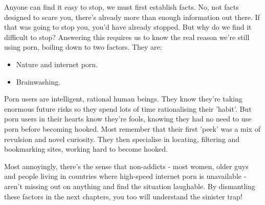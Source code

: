 \documentclass[
]{book}
\begin{document}
Anyone can find it easy to stop, we must first establish facts. No, not facts designed to scare you, there's already more than enough information out there. If that was going to stop you, you'd have already stopped. But why do we find it difficult to stop? Answering this requires us to know the real reason we're still using porn, boiling down to two factors. They are:

\begin{itemize}
\item
  Nature and internet porn.
\item
  Brainwashing.
\end{itemize}

Porn users are intelligent, rational human beings. They know they're taking enormous future risks so they spend lots of time rationalising their 'habit'. But porn users in their hearts know they're fools, knowing they had no need to use porn before becoming hooked. Most remember that their first 'peek' was a mix of revulsion and novel curiosity. They then specialise in locating, filtering and bookmarking sites, working hard to become hooked.

Most annoyingly, there's the sense that non-addicts - most women, older guys and people living in countries where high-speed internet porn is unavailable - aren't missing out on anything and find the situation laughable. By dismantling these factors in the next chapters, you too will understand the sinister trap!

  
\end{document}
